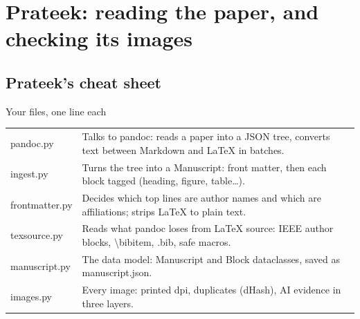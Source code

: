 \part{Prateek: reading the paper, and checking its images}

\chapter{Prateek's cheat sheet}

\begin{cheat}{Your files, one line each}
\begin{tabularx}{\linewidth}{>{\ttfamily}l X}
pandoc.py & Talks to pandoc: reads a paper into a JSON tree, converts text between Markdown and LaTeX in batches.\\
ingest.py & Turns the tree into a Manuscript: front matter, then each block tagged (heading, figure, table\dots).\\
frontmatter.py & Decides which top lines are author names and which are affiliations; strips LaTeX to plain text.\\
texsource.py & Reads what pandoc loses from LaTeX source: IEEE author blocks, \textbackslash bibitem, .bib, safe macros.\\
manuscript.py & The data model: Manuscript and Block dataclasses, saved as manuscript.json.\\
images.py & Every image: printed dpi, duplicates (dHash), AI evidence in three layers.\\
\end{tabularx}
\end{cheat}

\begin{center}
\end{center}

